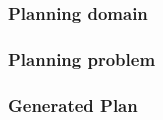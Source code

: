 \documentclass[paper=a4, fontsize=11pt]{scrartcl}
\begin{document}
	
	\subsubsection*{Planning domain}
	
	\subsubsection*{Planning problem}
	
	\subsubsection*{Generated Plan}
	 
	  
 	

	
	{}
	
	
	
\end{document}
